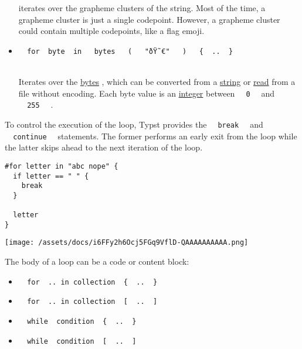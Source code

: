 \begin{itemize}
  iterates over the grapheme clusters of the string. Most of the time, a
  grapheme cluster is just a single codepoint. However, a grapheme
  cluster could contain multiple codepoints, like a flag emoji.
\item
  \texttt{\ }{\texttt{\ for\ }}\texttt{\ byte\ }{\texttt{\ in\ }}\texttt{\ }{\texttt{\ bytes\ }}\texttt{\ }{\texttt{\ (\ }}\texttt{\ }{\texttt{\ "ðŸ˜€"\ }}\texttt{\ }{\texttt{\ )\ }}\texttt{\ }{\texttt{\ \{\ }}\texttt{\ ..\ }{\texttt{\ \}\ }}\texttt{\ }\strut \\
  Iterates over the \href{/docs/reference/foundations/bytes/}{bytes} ,
  which can be converted from a
  \href{/docs/reference/foundations/str/}{string} or
  \href{/docs/reference/data-loading/read/}{read} from a file without
  encoding. Each byte value is an
  \href{/docs/reference/foundations/int/}{integer} between
  \texttt{\ }{\texttt{\ 0\ }}\texttt{\ } and
  \texttt{\ }{\texttt{\ 255\ }}\texttt{\ } .
\end{itemize}

To control the execution of the loop, Typst provides the
\texttt{\ }{\texttt{\ break\ }}\texttt{\ } and
\texttt{\ }{\texttt{\ continue\ }}\texttt{\ } statements. The former
performs an early exit from the loop while the latter skips ahead to the
next iteration of the loop.

\begin{verbatim}
#for letter in "abc nope" {
  if letter == " " {
    break
  }

  letter
}
\end{verbatim}

\texttt{[image: /assets/docs/i6FFy2h6Ocj5FGq9VflD-QAAAAAAAAAA.png]}

The body of a loop can be a code or content block:

\begin{itemize}
\tightlist
\item
  \texttt{\ }{\texttt{\ for\ }}\texttt{\ ..\ in\ collection\ }{\texttt{\ \{\ }}\texttt{\ ..\ }{\texttt{\ \}\ }}\texttt{\ }
\item
  \texttt{\ }{\texttt{\ for\ }}\texttt{\ ..\ in\ collection\ }{\texttt{\ {[}\ }}\texttt{\ ..\ }{\texttt{\ {]}\ }}\texttt{\ }
\item
  \texttt{\ }{\texttt{\ while\ }}\texttt{\ condition\ }{\texttt{\ \{\ }}\texttt{\ ..\ }{\texttt{\ \}\ }}\texttt{\ }
\item
  \texttt{\ }{\texttt{\ while\ }}\texttt{\ condition\ }{\texttt{\ {[}\ }}\texttt{\ ..\ }{\texttt{\ {]}\ }}\texttt{\ }
\end{itemize}


